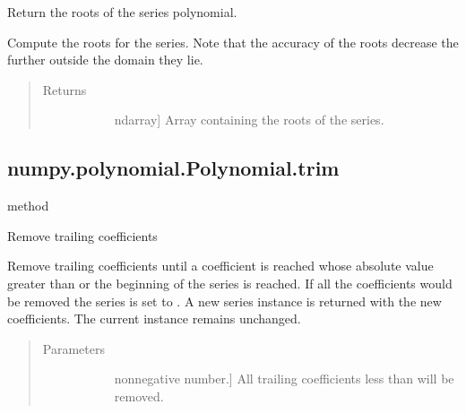 \documentclass[letterpaper,10pt,english]{sphinxmanual}
\begin{document}
\begin{fulllineitems}
\begin{fulllineitems}
\label{\detokenize{generated/generated/numpy.polynomial.Polynomial.roots:numpy.polynomial.Polynomial.roots}}
Return the roots of the series polynomial.

Compute the roots for the series. Note that the accuracy of the
roots decrease the further outside the domain they lie.
\begin{quote}\begin{description}
\item[{Returns}] \leavevmode\begin{description}
\item[{}] \leavevmode{[}ndarray{]}
Array containing the roots of the series.

\end{description}

\end{description}\end{quote}

\end{fulllineitems}



\subsection{numpy.polynomial.Polynomial.trim}
\label{\detokenize{generated/generated/numpy.polynomial.Polynomial.trim:numpy-polynomial-polynomial-trim}}\label{\detokenize{generated/generated/numpy.polynomial.Polynomial.trim::doc}}
method

\begin{fulllineitems}
\label{\detokenize{generated/generated/numpy.polynomial.Polynomial.trim:numpy.polynomial.Polynomial.trim}}
Remove trailing coefficients

Remove trailing coefficients until a coefficient is reached whose
absolute value greater than  or the beginning of the series is
reached. If all the coefficients would be removed the series is set
to \sphinxcode{\sphinxupquote{{[}0{]}}}. A new series instance is returned with the new
coefficients.  The current instance remains unchanged.
\begin{quote}\begin{description}
\item[{Parameters}] \leavevmode\begin{description}
\item[{}] \leavevmode{[}non\sphinxhyphen{}negative number.{]}
All trailing coefficients less than  will be removed.


\end{description}
\end{description}
\end{quote}
\end{fulllineitems}
\end{fulllineitems}
\end{document}
